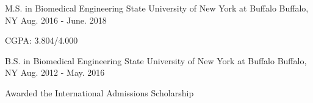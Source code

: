 

\begin{cventries}

    
  \cventry
  	{M.S. in Biomedical Engineering} %
    {State University of New York at Buffalo} %
    {Buffalo, NY} %
    {Aug. 2016 -  June. 2018} %
    {
      \begin{cvitems} %
        \item {CGPA: 3.804/4.000}
      \end{cvitems}
    }  
  
  
  \cventry
    {B.S. in Biomedical Engineering} %
    {State University of New York at Buffalo} %
    {Buffalo, NY} %
    {Aug. 2012 - May. 2016} %
    {
      \begin{cvitems} %
        \item {Awarded the International Admissions Scholarship}
      \end{cvitems}
    }


\end{cventries}

